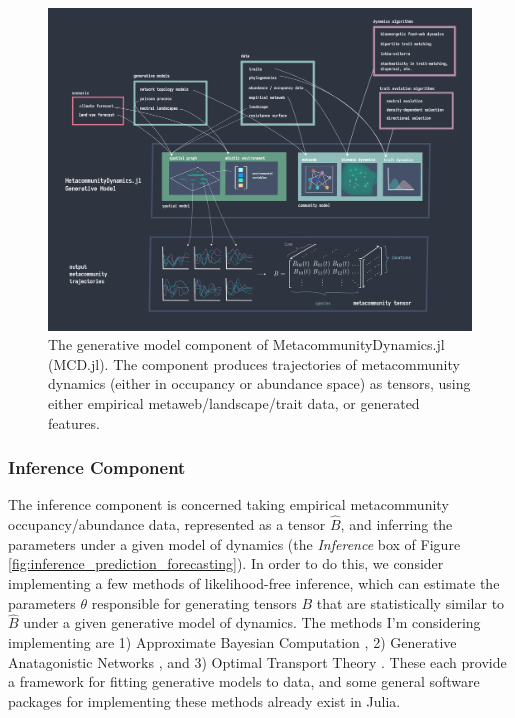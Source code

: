 \documentclass[]{article}
\begin{document}
\begin{figure}[h]
    \centering
    \includegraphics[width=17cm]{figs/software.png}
    \caption{The generative model component of MetacommunityDynamics.jl (MCD.jl). The component produces trajectories of metacommunity dynamics (either in occupancy or abundance space) as tensors, using either empirical metaweb/landscape/trait data, or generated features.} 
    \label{fig:software}
\end{figure}


\subsubsection{Inference Component}

The inference component is concerned taking empirical metacommunity occupancy/abundance data, represented as a tensor $\hat{B}$, and inferring the parameters under a given model of dynamics (the \textit{Inference} box of  Figure \ref{fig:inference_prediction_forecasting}). In order to do this, we consider implementing a few methods of likelihood-free inference, which can estimate the parameters $\theta$ responsible for generating tensors $B$ that are statistically similar to $\hat{B}$ under a given generative model of dynamics. The methods I'm considering implementing are 1) Approximate Bayesian Computation \cite{beaumont_approximate_2019}, 2) Generative Anatagonistic Networks \cite{radford2015unsupervised}, and 3) Optimal Transport Theory \cite{cuturi_opt}. These each provide a framework for fitting generative models to data, and some general software packages for implementing these methods already exist in Julia.   
\end{document}
